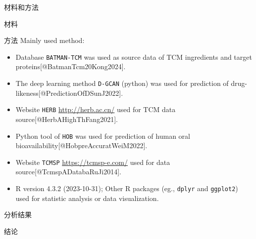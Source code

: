 \documentclass[
  ignorenonframetext,
]{beamer}
\providecommand{\tightlist}{%
  \setlength{\itemsep}{0pt}\setlength{\parskip}{0pt}}
\begin{document}
\begin{frame}[fragile]{材料和方法}
\protect\hypertarget{methods}{}
\begin{block}{材料}
\protect\hypertarget{ux6750ux6599}{}
\end{block}

\begin{block}{方法}
\protect\hypertarget{ux65b9ux6cd5}{}
Mainly used method:

\begin{itemize}
\tightlist
\item
  Database \texttt{BATMAN-TCM} was used as source data of TCM
  ingredients and target proteins{[}@BatmanTcm20Kong2024{]}.
\item
  The deep learning method \texttt{D-GCAN} (python) was used for
  prediction of drug-likeness{[}@PredictionOfDSunJ2022{]}.
\item
  Website \texttt{HERB} \url{http://herb.ac.cn/} used for TCM data
  source{[}@HerbAHighThFang2021{]}.
\item
  Python tool of \texttt{HOB} was used for prediction of human oral
  bioavailability{[}@HobpreAccuratWeiM2022{]}.
\item
  Website \texttt{TCMSP} \url{https://tcmsp-e.com/} used for data
  source{[}@TcmspADatabaRuJi2014{]}.
\item
  R version 4.3.2 (2023-10-31); Other R packages (eg., \texttt{dplyr}
  and \texttt{ggplot2}) used for statistic analysis or data
  visualization.
\end{itemize}
\end{block}
\end{frame}

\begin{frame}{分析结果}
\protect\hypertarget{results}{}
\end{frame}

\begin{frame}{结论}
\protect\hypertarget{dis}{}
\end{frame}
\end{document}
